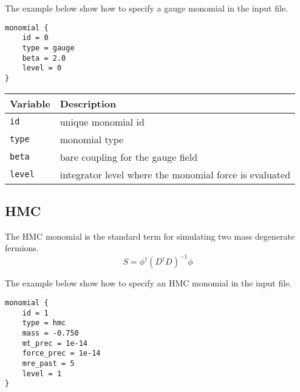 \documentclass[12pt]{article}
\begin{document}
The example below show how to specify a gauge monomial in the input file.
\begin{center}
\begin{minipage}{42mm}
\begin{framed}
\begin{verbatim}
monomial {
    id = 0
    type = gauge
    beta = 2.0
    level = 0
}
\end{verbatim}
\vspace{-5mm}
\end{framed}
\end{minipage}
\end{center}

\vspace{2mm}

\begin{center}
\begin{tabular}{l|l}
 Variable & Description \\
 \hline
 \verb|id|    & unique monomial id \\
 \verb|type|  & monomial type \\
 \verb|beta|  & bare coupling for the gauge field \\
 \verb|level| & integrator level where the monomial force is evaluated
\end{tabular}
\end{center}

\newpage
\subsection*{HMC}
The HMC monomial is the standard term for simulating two mass degenerate fermions.
\begin{equation}
 S = \phi^\dagger(D^\dagger D)^{-1}\phi
\end{equation}

The example below show how to specify an HMC monomial in the input file.
\begin{center}
\begin{minipage}{55mm}
\begin{framed}
\begin{verbatim}
monomial {
    id = 1
    type = hmc
    mass = -0.750
    mt_prec = 1e-14
    force_prec = 1e-14
    mre_past = 5
    level = 1
}
\end{verbatim}
\vspace{-5mm}
\end{framed}
\end{minipage}
\end{center}
\end{document}
